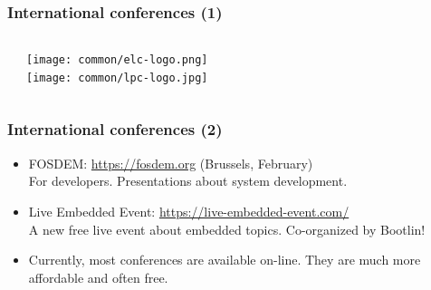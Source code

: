 \begin{frame}
  \frametitle{International conferences (1)}
  \begin{columns}
    \begin{itemize}
    
    
    \end{itemize}
     \texttt{[image: common/elc-logo.png]}\\
     \vspace{1cm}
     \texttt{[image: common/lpc-logo.jpg]}\\
  \end{columns}
\end{frame}

\begin{frame}
  \frametitle{International conferences (2)}
  \begin{itemize}
  \item FOSDEM: \url{https://fosdem.org} (Brussels, February)\\
    For developers. Presentations about system development.
  \item Live Embedded Event: \url{https://live-embedded-event.com/}\\
	A new free live event about embedded topics. Co-organized by
        Bootlin!
  \item Currently, most conferences are available on-line. They
        are much more affordable and often free.
  \end{itemize}
\end{frame}
